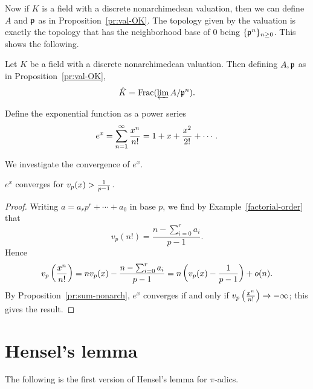 Now if $K$ is a field with a discrete nonarchimedean valuation, then we can define $A$ and $\mathfrak{p}$ as in Proposition~\ref{pr:val-OK}. The topology given by the valuation is exactly the topology that has the neighborhood base of 0 being $\{\mathfrak{p}^n\}_{n\ge 0}$. This shows the following.
\begin{pr}
Let $K$ be a field with a discrete nonarchimedean valuation. Then defining $A,\mathfrak{p}$ as in Proposition~\ref{pr:val-OK}, 
\[
\hat{K}=\operatorname{Frac}(\varprojlim A/\mathfrak{p}^n).
\]
\end{pr}

\begin{df}
Define the exponential function as a power series
\[
e^x=\sum_{n=1}^{\infty} \frac{x^n}{n!}=1+x+\frac{x^2}{2!}+\cdots.
\]
\end{df}
We investigate the convergence of $e^x$. 
\begin{pr}
$e^x$ converges for $v_p(x)>\frac{1}{p-1}$.
\end{pr}
\begin{proof}
Writing $a=a_rp^r+\cdots +a_0$ in base $p$, we find by Example~\ref{factorial-order} that
\[
v_p(n!)=\frac{n-\sum_{i=0}^r a_i}{p-1}.
\]
Hence 
\[v_p\left( {\frac{x^n}{n!}} \right)=nv_p(x)-\frac{n-\sum_{i=0}^r a_i}{p-1}=n\left( {v_p(x)-\frac{1}{p-1}} \right)+o(n).\]
By Proposition~\ref{pr:sum-nonarch}, $e^x$ converges if and only if $v_p\left( {\frac{x^n}{n!}} \right)\to -\infty$; this gives the result.
\end{proof}

\section{Hensel's lemma}
The following is the first version of Hensel's lemma for $\pi$-adics. 

